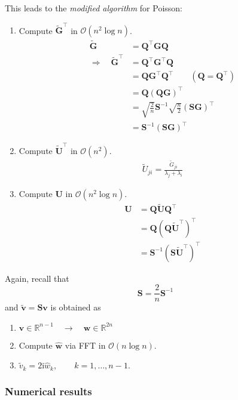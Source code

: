 This leads to the \emph{modified algorithm} for Poisson:
\begin{enumerate}
\item Compute $\tilde{\bm G}^\intercal$ in $\mathcal{O}(n^2\log n)$.
  \begin{align*}
    \tilde{\bm G} &= \bm Q^\intercal \bm G \bm Q \\
    \Rightarrow \quad \tilde{\bm G}^\intercal &= \bm Q^\intercal \bm G^\intercal \bm Q\\
                  &= \bm Q \bm G^\intercal \bm Q^\intercal \qquad (\bm Q = \bm Q^\intercal) \\
                  &= \bm Q (\bm Q \bm G)^\intercal \\
                  &= \sqrt{\frac{2}{n}}\bm S^{-1} \sqrt{\frac{n}{2}} (\bm S \bm G)^\intercal \\
                  &= \bm S^{-1} (\bm S \bm G)^\intercal
  \end{align*}
\item Compute $\tilde{\bm U}^\intercal$ in $\mathcal{O}(n^2)$.
  \begin{align*}
    \tilde{U}_{ji} = \frac{\tilde{G}_{ji}}{\lambda_j + \lambda_i}
  \end{align*}
\item Compute $\bm U$ in $\mathcal{O}(n^2\log n)$.
  \begin{align*}
    \bm U &= \bm Q \tilde{\bm U} \bm Q^\intercal \\
          &= \bm Q (\bm Q \tilde{\bm U}^\intercal)^\intercal \\
          &= \bm S^{-1} (\bm S \tilde{\bm U}^\intercal)^\intercal
  \end{align*}
\end{enumerate}

Again, recall that
\begin{equation*}
  \bm S = \frac{2}{n}\bm S^{-1}
\end{equation*}
and $\tilde{\bm v} = \bm S \bm v$ is obtained as
\begin{enumerate}
\item $\bm v \in \mathbb{R}^{n-1} \quad \rightarrow \quad \bm w \in \mathbb{R}^{2n}$
\item Compute $\hat{\bm w}$ via FFT in $\mathcal{O}(n \log n)$.
\item $\tilde{v}_k = 2\text{i} \hat{w}_k, \qquad k=1,\ldots,n-1.$
\end{enumerate}

\subsubsection{Numerical results}

